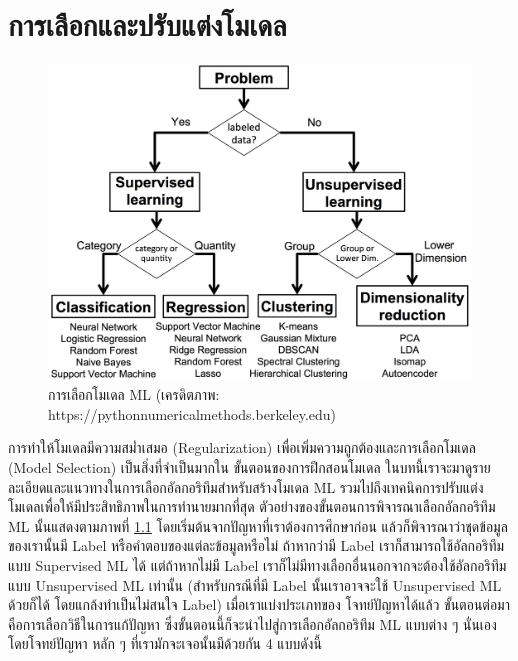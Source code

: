 

\chapter{การเลือกและปรับแต่งโมเดล}
\label{ch:reg_sel_model}

\begin{figure}[htbp]
    \centering
    \includegraphics[width=0.9\linewidth]{fig/ml-prediction.jpg}
    \caption{การเลือกโมเดล ML (เครดิตภาพ: https://pythonnumericalmethods.berkeley.edu)}
    \label{fig:ml_prediction}
\end{figure}

การทำให้โมเดลมีความสม่ำเสมอ (Regularization) เพื่อเพิ่มความถูกต้องและการเลือกโมเดล (Model Selection) เป็นสิ่งที่จำเป็นมากใน%
ขั้นตอนของการฝึกสอนโมเดล ในบทนี้เราจะมาดูรายละเอียดและแนวทางในการเลือกอัลกอริทึมสำหรับสร้างโมเดล ML รวมไปถึงเทคนิคการปรับแต่ง%
โมเดลเพื่อให้มีประสิทธิภาพในการทำนายมากที่สุด ตัวอย่างของขั้นตอนการพิจารณาเลือกอัลกอริทึม ML นั้นแสดงตามภาพที่ \ref{fig:ml_prediction}
โดยเริ่มต้นจากปัญหาที่เราต้องการศึกษาก่อน แล้วก็พิจารณาว่าชุดข้อมูลของเรานั้นมี Label หรือคำตอบของแต่ละข้อมูลหรือไม่ ถ้าหากว่ามี Label 
เราก็สามารถใช้อัลกอริทึมแบบ Supervised ML ได้ แต่ถ้าหากไม่มี Label เราก็ไม่มีทางเลือกอื่นนอกจากจะต้องใช้อัลกอริทึมแบบ Unsupervised 
ML เท่านั้น (สำหรับกรณีที่มี Label นั้นเราอาจจะใช้ Unsupervised ML ด้วยก็ได้ โดยแกล้งทำเป็นไม่สนใจ Label) เมื่อเราแบ่งประเภทของ%
โจทย์ปัญหาได้แล้ว ขั้นตอนต่อมาคือการเลือกวิธีในการแก้ปัญหา ซึ่งขั้นตอนนี้ก็จะนำไปสู่การเลือกอัลกอริทึม ML แบบต่าง ๆ นั่นเอง โดยโจทย์ปัญหา%
หลัก ๆ ที่เรามักจะเจอนั้นมีด้วยกัน 4 แบบดังนี้

